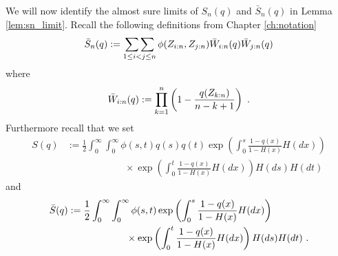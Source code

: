 %
%
We will now identify the almost sure limits of $S_n(q)$ and $\bar{S}_n(q)$ in Lemma \ref{lem:sn_limit}. Recall the following definitions from Chapter \ref{ch:notation}
$$\bar{S}_n(q) := \mathop{\sum\sum}\limits_{1\leq i < j \leq n} \phi(Z_{i:n},Z_{j:n}) \bar{W}_{i:n}(q) \bar{W}_{j:n}(q)$$
where 
$$\bar{W}_{i:n}(q) := \prod_{k=1}^{n}\left(1-\frac{q(Z_{k:n})}{n-k+1}\right)\textrm{ .}$$
Furthermore recall that we set
\begin{align*}
	S(q) &:= \frac{1}{2}\int_{0}^{\infty} \int_{0}^{\infty} \phi(s,t) q(s)q(t) \exp\left(\int_{0}^{s} \frac{1-q(x)}{1-H(x)} H(dx)\right)\\
	&\qquad\qquad\qquad \times \exp\left(\int_{0}^{t} \frac{1-q(x)}{1-H(x)} H(dx) \right)H(ds)H(dt)
\end{align*}
and 
\begin{align*}
	\bar{S}(q) &:= \frac{1}{2}\int_{0}^{\infty} \int_{0}^{\infty} \phi(s,t)  \exp\left(\int_{0}^{s} \frac{1-q(x)}{1-H(x)} H(dx)\right)\\
	&\qquad\qquad\qquad \times \exp\left(\int_{0}^{t} \frac{1-q(x)}{1-H(x)} H(dx) \right)H(ds)H(dt)\textrm{ .}
\end{align*}

